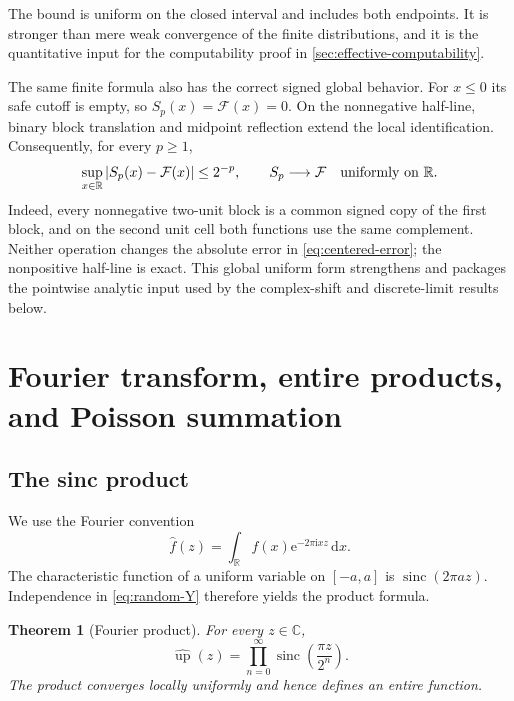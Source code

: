\documentclass[11pt,oneside]{article}
\newtheorem{theorem}{Theorem}[section]
\theoremstyle{definition}
\theoremstyle{remark}
\newcommand{\R}{\mathbb R}
\newcommand{\C}{\mathbb C}
\newcommand{\Up}{\operatorname{up}}
\newcommand{\sinc}{\operatorname{sinc}}
\newcommand{\e}{\mathrm e}
\newcommand{\ii}{\mathrm i}
\newcommand{\dd}{\,\mathrm d}
\begin{document}
The bound is uniform on the closed interval and includes both endpoints.  It is stronger
than mere weak convergence of the finite distributions, and it is the quantitative input
for the computability proof in \cref{sec:effective-computability}.

The same finite formula also has the correct signed global behavior.  For $x\le0$ its safe
cutoff is empty, so $S_p(x)=\mathcal F(x)=0$.  On the nonnegative half-line, binary block
translation and midpoint reflection extend the local identification.  Consequently, for
every $p\ge1$,
\begin{equation}
 \sup_{x\in\R}|S_p(x)-\mathcal F(x)|\le2^{-p},\qquad
 S_p\longrightarrow\mathcal F\quad\hbox{uniformly on }\R. \label{eq:centered-spline-global-limit}
\end{equation}
Indeed, every nonnegative two-unit block is a common signed copy of the first block, and
on the second unit cell both functions use the same complement.  Neither operation changes
the absolute error in \eqref{eq:centered-error}; the nonpositive half-line is exact.  This
global uniform form strengthens and packages the pointwise analytic input used by the
complex-shift and discrete-limit results below.

\section{Fourier transform, entire products, and Poisson summation}
\label{sec:fourier}

\subsection{The sinc product}

We use the Fourier convention
\begin{equation}
 \widehat f(z)=\int_\R f(x)\e^{-2\pi\ii xz}\dd x.          \label{eq:fourier-convention}
\end{equation}
The characteristic function of a uniform variable on $[-a,a]$ is
$\sinc(2\pi az)$.  Independence in \eqref{eq:random-Y} therefore yields the product
formula.

\begin{theorem}[Fourier product]
For every $z\in\C$,
\begin{equation}
 \widehat{\Up}(z)=\prod_{n=0}^{\infty}
   \sinc\!\left(\frac{\pi z}{2^n}\right).                 \label{eq:sinc-product}
\end{equation}
The product converges locally uniformly and hence defines an entire function.
\end{theorem}
\end{document}
